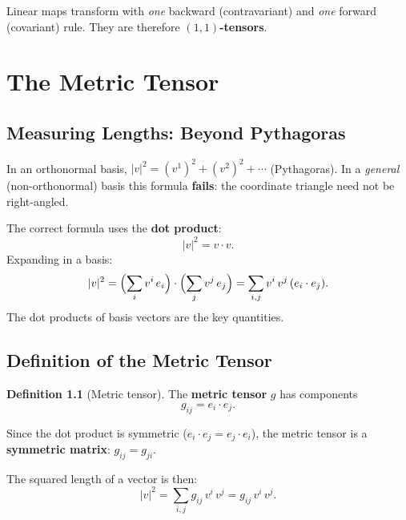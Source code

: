 \documentclass[12pt, a4paper]{report}
\theoremstyle{definition}
\newtheorem{definition}{Definition}[chapter]
\theoremstyle{plain}
\theoremstyle{remark}
\begin{document}
Linear maps transform with \emph{one} backward (contravariant) and \emph{one}
forward (covariant) rule.  They are therefore \textbf{$(1,1)$-tensors}.

\chapter{The Metric Tensor}\label{ch:metric}

\section{Measuring Lengths: Beyond Pythagoras}

In an orthonormal basis, $|v|^{2} = (v^{1})^{2} + (v^{2})^{2} + \cdots$
(Pythagoras).  In a \emph{general} (non-orthonormal) basis this formula
\textbf{fails}: the coordinate triangle need not be right-angled.

The correct formula uses the \textbf{dot product}:
\begin{equation}\label{eq:len-dot}
    |v|^{2} = v \cdot v.
\end{equation}
Expanding in a basis:
\begin{equation}\label{eq:len-expand}
    |v|^{2}
    = \Bigl(\sum_i v^{i}\,e_i\Bigr)\cdot\Bigl(\sum_j v^{j}\,e_j\Bigr)
    = \sum_{i,j} v^{i}\,v^{j}\,(e_i \cdot e_j).
\end{equation}
The dot products of basis vectors are the key quantities.

\section{Definition of the Metric Tensor}

\begin{definition}[Metric tensor]
The \textbf{metric tensor} $g$ has components
\begin{equation}\label{eq:metric-def}
    \boxed{g_{ij} = e_i \cdot e_j.}
\end{equation}
\end{definition}

Since the dot product is symmetric ($e_i \cdot e_j = e_j \cdot e_i$), the metric
tensor is a \textbf{symmetric matrix}: $g_{ij} = g_{ji}$.

The squared length of a vector is then:
\begin{equation}\label{eq:metric-length}
    \boxed{|v|^{2} = \sum_{i,j} g_{ij}\, v^{i}\, v^{j} = g_{ij}\, v^{i}\, v^{j}.}
\end{equation}
\end{document}
